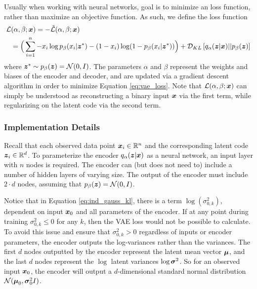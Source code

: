 Usually when working with neural networks, goal is to minimize an loss function, rather than maximize an objective function. As such, we define the loss function 
\begin{equation}
  \label{eq:vae_loss}
  \begin{split}
  \mathcal{L}&(\alpha, \beta; \boldsymbol{x}) = - \tilde{\mathcal{L}}(\alpha, \beta;\boldsymbol{x}) \\
  &= \Big(\sum_{i=1}^n - x_i\log p_\beta(x_i | \boldsymbol{z}^*) - (1-x_i)\log (1-p_\beta(x_i | \boldsymbol{z}^*)) \Big) + \mathcal{D}_{KL}\left[ q_\alpha(\boldsymbol{z} | \boldsymbol{x}) || p_\beta(\boldsymbol{z}) \right]
  \end{split}
\end{equation}
where $\boldsymbol{z}^* \sim p_\beta(\boldsymbol{z}) = \mathcal{N}(0,I)$. The parameters $\alpha$ and $\beta$ represent the weights and biases of the encoder and decoder, and are updated via a gradient descent algorithm in order to minimize Equation \ref{eq:vae_loss}. Note that $\mathcal{L}(\alpha, \beta; \boldsymbol{x})$ can simply be understood as reconstructing a binary input $\boldsymbol{x}$ via the first term, while regularizing on the latent code via the second term.


\subsubsection{Implementation Details}
Recall that each observed data point $\boldsymbol{x}_i \in \mathbb{R}^n$ and the corresponding latent code $\boldsymbol{z}_i \in \mathbb{R}^d$. To parameterize the encoder $q_\alpha(\boldsymbol{z} | \boldsymbol{x})$ as a neural network, an input layer with $n$ nodes is required. The encoder can (but does not need to) include a number of hidden layers of varying size. The output of the encoder must include $2\cdot d$ nodes, assuming that $p_\beta(\boldsymbol{z}) = \mathcal{N}(0,I)$. 

Notice that in Equation \ref{eq:ind_gauss_kl}, there is a term $\log(\sigma_{0,k}^2)$, dependent on input $\boldsymbol{x}_0$ and all parameters of the encoder. If at any point during training $\sigma_{0,k}^2 \leq 0$ for any $k$, then the VAE loss would not be possible to calculate. To avoid this issue and ensure that $\sigma_{0,k}^2 > 0$ regardless of inputs or encoder parameters, the encoder outputs the log-variances rather than the variances. The first $d$ nodes outputted by the encoder represent the latent mean vector $\boldsymbol{\mu}$, and the last $d$ nodes represent the $\log$ latent variances $\log \boldsymbol{\sigma}^2$. So for an observed input $\boldsymbol{x}_0$, the encoder will output a $d$-dimensional standard normal distribution $\mathcal{N}(\boldsymbol{\mu}_0, \boldsymbol{\sigma}_0^2I)$.


